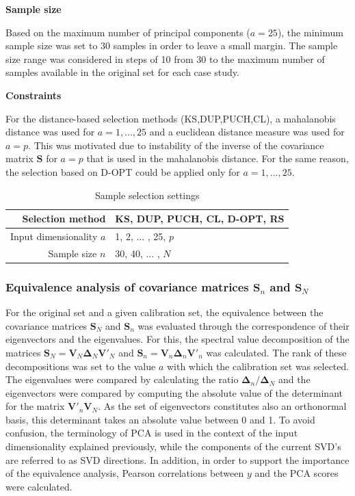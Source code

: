 \documentclass[journal=ancham,manuscript=article]{achemso}
\begin{document}
\textbf{Sample size}

Based on the maximum number of principal components ($a=25$), the minimum sample size was set to 30 samples in order to leave a small margin. The sample size range was considered in steps of 10 from 30 to the maximum number of samples available in the original set for each case study. 

\textbf{Constraints}

For the distance-based selection methods (KS,DUP,PUCH,CL), a mahalanobis distance was used for $a=1,...,25$ and a euclidean distance measure was used for $a=p$. This was motivated due to instability of the inverse of the covariance matrix $\mathbf{S}$ for $a=p$ that is used in the mahalanobis distance. For the same reason, the selection based on D-OPT could be applied only for $a=1,...,25$. 

\begin{table}[t]
\centering
\begin{tabular}{|r|l|} 
\hline
Selection method & KS, DUP, PUCH, CL, D-OPT, RS\\
\hline
Input dimensionality $a$ & 1, 2, ... , 25, $p$ \\
\hline
Sample size $n$ & 30, 40, ... , $N$ \\
\hline

\end{tabular}
\caption{Sample selection settings}
\label{tab_samplesel_settings_exhaustive_search}
\end{table}

\subsubsection{Equivalence analysis of covariance matrices $\mathbf{S}_n$ and $\mathbf{S}_N$}

For the original set and a given calibration set, the equivalence between the covariance matrices $\mathbf{S}_N$ and $\mathbf{S}_n$ was evaluated through the correspondence of their eigenvectors and the eigenvalues. For this, the spectral value decomposition of the matrices $\mathbf{S}_N = \mathbf{V}_N \mathbf{\Delta}_N \mathbf{V}'_N$ and $\mathbf{S}_n = \mathbf{V}_n \mathbf{\Delta}_n \mathbf{V}'_n$ was calculated. The rank of these decompositions was set to the value $a$ with which the calibration set was selected. The eigenvalues were compared by calculating the ratio  $\mathbf{\Delta}_n/\mathbf{\Delta}_N$ and the eigenvectors were compared by computing the absolute value of the determinant for the matrix $\mathbf{V}'_n\mathbf{V}_N$. As the set of eigenvectors constitutes also an orthonormal basis, this determinant takes an absolute value between 0 and 1. To avoid confusion, the terminology of PCA is used in the context of the input dimensionality explained previously, while the components of the current SVD's are referred to as SVD directions. 
In addition, in order to support the importance of the equivalence analysis, Pearson correlations between $y$ and the PCA scores were calculated.
\end{document}
